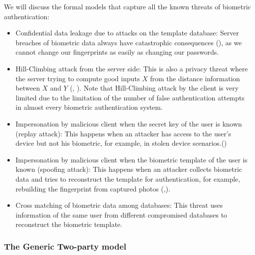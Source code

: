 We will discuss the formal models that capture all the known threats of biometric authentication:
\begin{itemize}
\item Confidential data leakage due to attacks on the template database: Server breaches of biometric data always have
  catastrophic consequences (\cite{OPMsays563:online}), as we cannot change our fingerprints as easily as changing our
  passwords.
\item Hill-Climbing attack from the server side: This is also a privacy threat where the server trying to compute good
  inputs $X$ from the distance information between $X$ and $Y$ (\cite{uludag2004attacks}, \cite{higo2015privacy}). Note
  that Hill-Climbing attack by the client is very limited due to the limitation of the number of false authentication
  attempts in almost every biometric authentication system.
\item Impersonation by malicious client when the secret key of the user is known (replay attack): This happens when an
  attacker has access to the user's device but not his biometric, for example, in stolen device
  scenarios.(\cite{zhang2015fingerprints})
\item Impersonation by malicious client when the biometric template of the user is known (spoofing attack): This happens
  when an attacker collects biometric data and tries to reconstruct the template for authentication, for example,
  rebuilding the fingerprint from captured photos (\cite{zhang2015fingerprints},\cite{feng2011fingerprint}).
\item Cross matching of biometric data among databases: This threat uses information of the same user from different
  compromised databases to reconstruct the biometric template.
\end{itemize}

\subsubsection{The Generic Two-party model}

